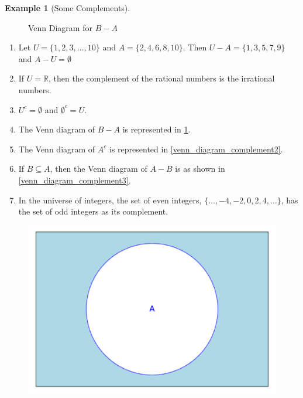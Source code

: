 \documentclass[10pt,]{book}
\theoremstyle{plain}
\theoremstyle{definition}
\theoremstyle{definition}
\theoremstyle{definition}
\newtheorem{example}[theorem]{Example}
\theoremstyle{definition}
\begin{document}
\begin{example}[Some Complements]
\begin{figure}
\caption{Venn Diagram for \(B - A\)\label{venn_diagram_complement1}}
\end{figure}
\leavevmode%
\begin{enumerate}[label=\alph*]
\item\hypertarget{li-65}{} Let \(U = \{1,2, 3, \text{...} , 10\}\) and \(A = \{2,4,6,8, 10\}\). Then \(U-A = \{1, 3, 5, 7, 9\}\) and \(A - U= \emptyset\)%
\item\hypertarget{li-66}{} If \(U = \mathbb{R}\), then the complement of the rational numbers is the irrational numbers. 
%
\item\hypertarget{li-67}{}\(U^c= \emptyset\) and \(\emptyset ^c= U\). 
%
\item\hypertarget{li-68}{} The Venn diagram of \(B - A\) is represented in \hyperref[venn_diagram_complement1]{\ref{venn_diagram_complement1}}. %
\item\hypertarget{li-69}{} The Venn diagram of \(A^c\) is represented in \hyperref[venn_diagram_complement2]{\ref{venn_diagram_complement2}}. %
\item\hypertarget{li-70}{} If \(B\subseteq A\), then the Venn diagram of \(A- B\) is as shown in \hyperref[venn_diagram_complement3]{\ref{venn_diagram_complement3}}. %
\item\hypertarget{li-71}{} In the universe of integers, the set of even integers, \(\{\ldots  , - 4,-2, 0, 2, 4,\ldots \}\), has the set of odd integers as its complement.%
\end{enumerate}
%
\leavevmode%
\begin{figure}
\centering
{}%
{\includegraphics[width=1\linewidth]{images/sageplot-venn-complement2.pdf}}%

\end{figure}
\end{example}
\end{document}
